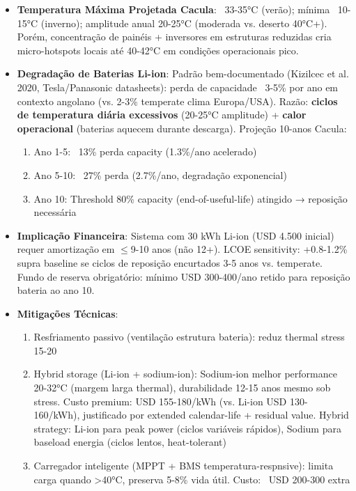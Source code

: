 \documentclass[12pt, a4paper]{article}
\begin{document}
\begin{itemize}
\item \textbf{Temperatura Máxima Projetada Cacula}: ~33-35°C (verão); mínima ~10-15°C (inverno); amplitude anual 20-25°C (moderada vs. deserto 40°C+). Porém, concentração  de painéis + inversores em estruturas reduzidas cria micro-hotspots locais até 40-42°C em condições operacionais pico.
\item 
\textbf{Degradação de Baterias Li-ion}: Padrão bem-documentado (Kizilcec et al. 2020, Tesla/Panasonic datasheets): perda de capacidade ~3-5\% por ano em contexto angolano (vs. 2-3\% temperate clima Europa/USA). Razão: 
\textbf{ciclos de temperatura diária excessivos} (20-25°C amplitude) + 
\textbf{calor operacional} (baterias aquecem durante descarga). Projeção 10-anos Cacula:
  \begin{enumerate}
  \item Ano 1-5: ~13\% perda capacity (1.3\%/ano acelerado)
  \item Ano 5-10: ~27\% perda (2.7\%/ano, degradação exponencial)
  \item Ano 10: Threshold 80\% capacity (end-of-useful-life) atingido → reposição necessária
  \end{enumerate}
\item \textbf{Implicação Financeira}: Sistema com 30 kWh Li-ion (USD 4.500 inicial) requer amortização em $\leq$9-10 anos (não 12+). LCOE sensitivity: +0.8-1.2\% supra baseline se ciclos de reposição encurtados 3-5 anos vs. temperate. Fundo de reserva obrigatório: mínimo USD 300-400/ano retido para reposição bateria ao ano 10.
\item \textbf{Mitigações Técnicas}:
  \begin{enumerate}
  \item Resfriamento passivo (ventilação estrutura bateria): reduz thermal stress 15-20%
  \item Hybrid storage (Li-ion + sodium-ion): Sodium-ion melhor performance 20-32°C (margem larga thermal), durabilidade 12-15 anos mesmo sob stress. Custo premium: USD 155-180/kWh (vs. Li-ion USD 130-160/kWh), justificado por extended calendar-life + residual value. Hybrid strategy: Li-ion para peak power (ciclos variáveis rápidos), Sodium para baseload energia (ciclos lentos, heat-tolerant)
  \item Carregador inteligente (MPPT + BMS temperatura-respnsive): limita carga quando >40°C, preserva 5-8\% vida útil. Custo: ~USD 200-300 extra
  \end{enumerate}
\end{itemize}
\end{document}
